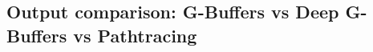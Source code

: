 \documentclass{ACGSeminar}
\begin{document}
	\subsection{Output comparison: G-Buffers vs Deep G-Buffers vs Pathtracing}

%

\label{cha:references}
\printbibliography
\end{document}
